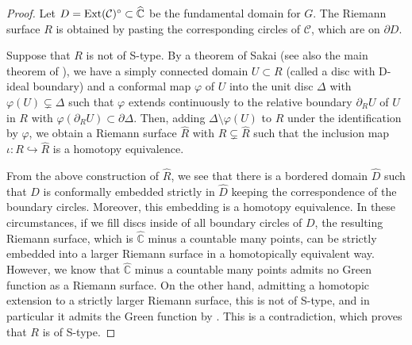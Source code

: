 \documentclass[12pt]{amsart}
\theoremstyle{plain}
\DeclareMathOperator{\Ext}{\rm Ext}
\begin{document}
\begin{proof}
Let $D=\Ext (\mathcal{C})^\circ \subset \widehat {\mathbb C}$ 
be the fundamental domain for $G$. The Riemann surface $R$ is obtained by
pasting the corresponding circles of $\mathcal{C}$, which are on $\partial D$. 

Suppose that $R$ is not of S-type. By a theorem of Sakai \cite{Sa} (see also the main theorem of \cite{MS}),
we have a simply connected domain $U \subset R$ 
(called a disc with D-ideal boundary)
and a conformal map $\varphi$ of $U$ into the unit disc $\Delta$ with
$\varphi(U) \subsetneq \Delta$ such that $\varphi$ extends continuously to the relative boundary $\partial_R U$ of
$U$ in $R$ with $\varphi(\partial_R U) \subset \partial \Delta$. Then,
adding $\Delta \setminus \varphi(U)$ to $R$ under the identification by $\varphi$, we obtain
a Riemann surface $\widehat R$ with
$R \subsetneq \widehat R$ such that
the inclusion map $\iota:R \hookrightarrow \widehat R$ is a homotopy equivalence.

From the above construction of $\widehat R$, we see that 
there is a bordered domain $\widehat D$ such that $D$ is conformally embedded strictly in $\widehat D$
keeping the correspondence of the boundary circles. Moreover, this embedding is a homotopy equivalence.
In these circumstances,
if we fill discs inside of all boundary circles of $D$, the resulting Riemann surface, which is
$\widehat {\mathbb C}$ minus a countable many points, can be strictly embedded into a larger Riemann surface
in a homotopically equivalent way. However, we know that $\widehat {\mathbb C}$ minus a countable many points
admits no Green function as a Riemann surface. 
On the other hand, admitting a homotopic extension to a strictly larger Riemann surface, 
this is not of S-type, and in particular 
it admits the Green function by \cite[Th.4]{MS}. This is a contradiction, which proves that $R$ is of S-type.
\end{proof}


\end{document}
